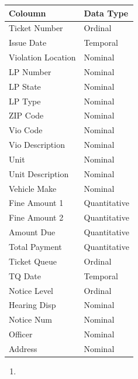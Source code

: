 \documentclass[
  letterpaper,
  DIV=11,
  numbers=noendperiod]{scrartcl}
\providecommand{\tightlist}{%
  \setlength{\itemsep}{0pt}\setlength{\parskip}{0pt}}\usepackage{longtable,booktabs,array}
\begin{document}
\begin{longtable}[]{@{}ll@{}}
\toprule\noalign{}
Coloumn & Data Type \\
\midrule\noalign{}
\endhead
\bottomrule\noalign{}
\endlastfoot
Ticket Number & Ordinal \\
Issue Date & Temporal \\
Violation Location & Nominal \\
LP Number & Nominal \\
LP State & Nominal \\
LP Type & Nominal \\
ZIP Code & Nominal \\
Vio Code & Nominal \\
Vio Description & Nominal \\
Unit & Nominal \\
Unit Description & Nominal \\
Vehicle Make & Nominal \\
Fine Amount 1 & Quantitative \\
Fine Amount 2 & Quantitative \\
Amount Due & Quantitative \\
Total Payment & Quantitative \\
Ticket Queue & Ordinal \\
TQ Date & Temporal \\
Notice Level & Ordinal \\
Hearing Disp & Nominal \\
Notice Num & Nominal \\
Officer & Nominal \\
Address & Nominal \\
\end{longtable}

\begin{enumerate}
\def\labelenumi{\arabic{enumi}.}
\tightlist
\item
\end{enumerate}
\end{document}

